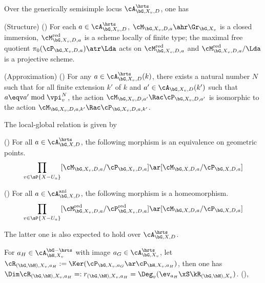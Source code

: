 \documentclass[article, a4paper, twoside]{universal}
\begin{document}
\begin{thm}
	Over the generically semisimple locus $\cA_{\bG,X_{v},D}^{\hrts}$, one has
	\begin{itm}
		\item (Structure) (\cite[Proposition~3.2.1, Proposition~3.4.1]{Ngo2010Lemme}) For each $a\in\cA_{\bG,X_{v},D}^{\hrts}$, $\cM_{\bG,X_{v},D,a}\ahr\Gr_{\bG,X_{v}}$ is a closed immersion, $\cM_{\bG,X_{v},D,a}^{\text{red}}$ is a scheme locally of finite type; the maximal free quotient $\pi_{0}(\cP_{\bG,X_{v},D,a})\atr\Lda$ acts on $\cM_{\bG,X_{v},D,a}^{\text{red}}$ and $\cM_{\bG,X_{v},D,a}^{\text{red}}/\Lda$ is a projective scheme.
		\item (Approximation) (\cite[Proposition~3.5.1]{Ngo2010Lemme}) For any $a\in\cA_{\bG,X_{v},D}^{\hrts}(k)$, there exists a natural number $N$ such that for all finite extension $k'$ of $k$ and $a'\in\cA_{\bG,X_{v},D}(k')$ such that $a\eqv a'\bmod{\vpi_{v}^{N}}$, the action $\cM_{\bG,X_{v},D,a'}\Rac\cP_{\bG,X_{v},D,a'}$ is isomorphic to the action $\cM_{\bG,X_{v},D,a,k'}\Rac\cP_{\bG,X_{v},D,a,k'}$.
	\end{itm}
\end{thm}

\begin{thm}
	The local-global relation is given by
	\begin{itm}
		\item (\cite[Theorem~4.6]{Ngo2006Hitchin}) For all $a\in\cA_{\bG,X,D}^{\hrts}$, the following morphism is an equivalence on geometric points.
		\[
			\prod_{v\in \sP{X-U_{a}}}[\cM_{\bG,X_{v},D,a}/\cP_{\bG,X_{v},D,a}]\ar[\cM_{\bG,X,D,a}/\cP_{\bG,X,D,a}]
		\]
		\item (\cite[Proposition~4.15.1]{Ngo2010Lemme}) For all $a\in\cA_{\bG,X,D}^{\text{ani}}$, the following morphism is a homeomorphism.
		\[
			\prod_{v\in \sP{X-U_{a}}}[\cM_{\bG,X_{v},D,a}^{\text{red}}/\cP_{\bG,X_{v},D,a}^{\text{red}}]\ar[\cM_{\bG,X,D,a}/\cP_{\bG,X,D,a}]
		\]
	\end{itm}
\end{thm}

\begin{rmk}
	The latter one is also expected to hold over $\cA_{\bG,X,D}^{\hrts}$.
\end{rmk}


\begin{stp}
	For $a_{H}\in\cA_{\bH,X_{v}}^{\bG-\hrts}$ with image $a_{G}\in\cA_{\bG,X_{v}}^{\hrts}$, let $\cR_{(\bG,\bH),X_{v},a_{H}}:=\Ker(\cP_{\bG,X_{v},a_{G}}\ar\cP_{\bH,X_{v},a_{H}})$, then one has $\Dim\cR_{(\bG,\bH),X_{v},a_{H}}=:r_{(\bG,\bH),X_{v},a_{H}}=\Deg_{v}(\ev_{a_{H}}\xS\kR_{(\bG,\bH),X_{v}})$.
	(\cite[Lemma~3.11.2]{Ngo2010Lemme}),
\end{stp}
\end{document}
